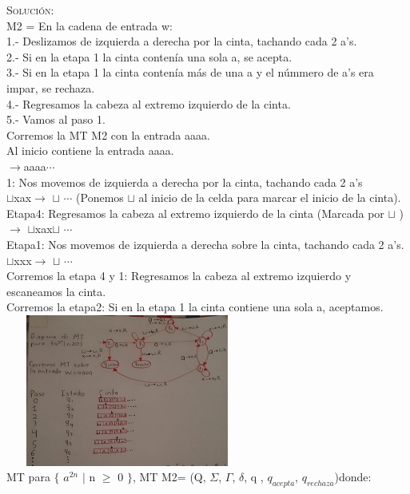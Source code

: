 \documentclass[letterpaper,10pt]{article}
\begin{document}
\begin{enumerate}
    \textsc{Solución:}
    \\  
	M2 = En la cadena de entrada w:\\
	1.- Deslizamos de izquierda a derecha por la cinta, tachando cada 2 a's.\\
	2.- Si en la etapa 1 la cinta contenía una sola a, se acepta.\\
	3.- Si en la etapa 1 la cinta contenía más de una a y el númmero  de a's era impar, se rechaza.\\
	4.- Regresamos la cabeza al extremo izquierdo de la cinta.\\
	5.- Vamos al paso 1.\\
	Corremos la MT M2 con la entrada aaaa.\\
	Al inicio contiene la entrada aaaa.\\
	$\rightarrow$aaaa$\cdots$\\
	1: Nos movemos de izquierda a derecha por la cinta, tachando cada 2 a's\\
		 $\sqcup$xax$\rightarrow$ $\sqcup$ $\cdots$ (Ponemos $\sqcup$ al inicio de la celda para marcar el inicio de la cinta).\\
	Etapa4: Regresamos la cabeza al extremo izquierdo de la cinta (Marcada por $\sqcup$ )\\
	$\rightarrow$  $\sqcup$xax$\sqcup$ $\cdots$ \\
	Etapa1: Nos movemos de izquierda a derecha sobre la cinta, tachando cada 2 a's. \\
	$\sqcup$xxx$\rightarrow$ $\sqcup$ $\cdots$\\
	Corremos la etapa 4 y 1: Regresamos la cabeza al extremo izquierdo y escaneamos la cinta.\\
	Corremos la etapa2: Si en la etapa 1 la cinta contiene una sola a, aceptamos.
	\\
	\includegraphics[width=8cm, height=5cm]{imagenuno}
	\\
	MT para $\lbrace$ $a^{2n}$ $\mid$ n $\geq$ 0 $\rbrace$, MT M2= (Q, $\Sigma$, $\Gamma$, $\delta$, q , $q_{acepta}$, $q_{rechaza}$)donde: \\

\end{enumerate}
\end{document}
